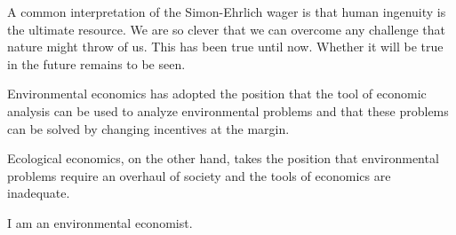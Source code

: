 A common interpretation of the Simon-Ehrlich wager is that human ingenuity is the ultimate resource. We are so clever that we can overcome any challenge that nature might throw of us. This has been true until now. Whether it will be true in the future remains to be seen.

Environmental economics has adopted the position that the tool of economic analysis can be used to analyze environmental problems and that these problems can be solved by changing incentives at the margin.

Ecological economics, on the other hand, takes the position that environmental problems require an overhaul of society and the tools of economics are inadequate.

I am an environmental economist.
